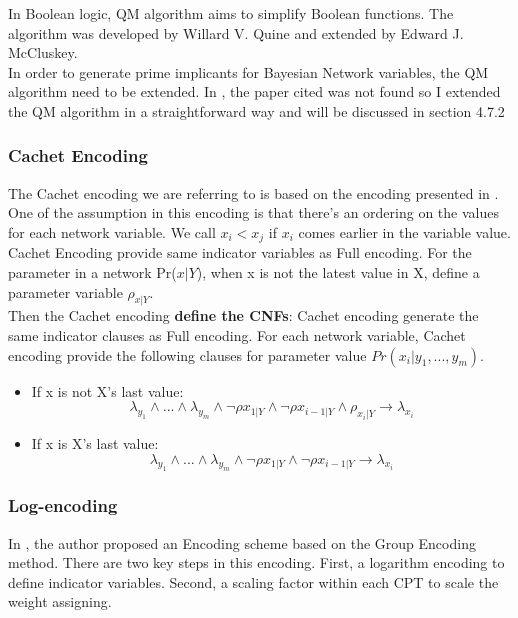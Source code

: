        \noindent In Boolean logic, QM algorithm aims to simplify Boolean functions. The algorithm was developed by Willard V. Quine and extended by Edward J. McCluskey.\\
        
       \noindent In order to generate prime implicants for Bayesian Network variables, the QM algorithm need to be extended. In \cite{2006-enc3}, the paper cited was not found so I extended the QM algorithm in a straightforward way and will be discussed in section 4.7.2
        
        \subsubsection{Cachet Encoding}
        The Cachet encoding we are referring to is based on the encoding presented in \cite{Sang:2005:PBI:1619332.1619409}. One of the assumption in this encoding is that there's an ordering on the values for each network variable. We call $x_{i} < x_{j}$ if $x_{i}$ comes earlier in the variable value.\\
        
        \noindent Cachet Encoding provide same indicator variables as Full encoding. For the parameter in a network Pr($x|Y$), when x is not the latest value in X, define a parameter variable $\rho_{x|Y}$.\\
        
        \noindent Then the Cachet encoding \textbf{define the CNFs}: Cachet encoding generate the same indicator clauses as Full encoding. For each network variable, Cachet encoding provide the following clauses for parameter value $Pr(x_{i}|y_{1}, ... , y_{m})$.
        \begin{itemize}
            \item If x is not X's last value: $$\lambda_{y_{1}} \wedge ... \wedge \lambda_{y_{m}} \wedge \neg \rho x_{1|Y} \wedge \neg \rho x_{i-1|Y} \wedge \rho_{x_{i}|Y} \rightarrow \lambda_{x_{i}}$$
            \item If x is X's last value:
            $$\lambda_{y_{1}} \wedge ... \wedge \lambda_{y_{m}} \wedge \neg \rho x_{1|Y} \wedge \neg \rho x_{i-1|Y} \rightarrow \lambda_{x_{i}}$$
        \end{itemize}
        \subsubsection{Log-encoding}
        In \cite{2016-logencoding}, the author proposed an Encoding scheme based on the Group Encoding method. There are two key steps in this encoding. First, a logarithm encoding to define indicator variables. Second, a scaling factor within each CPT to scale the weight assigning.\\
        
